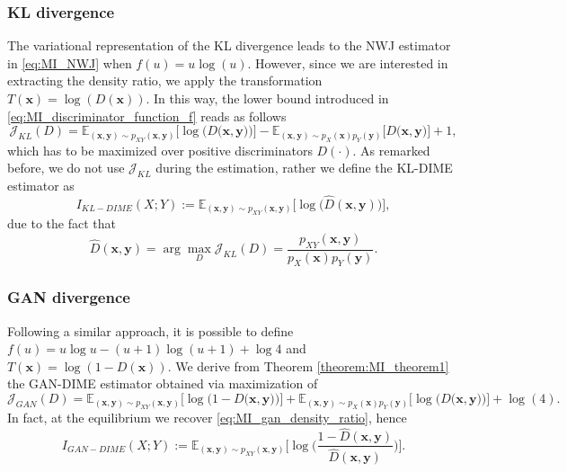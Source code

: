 \subsubsection{KL divergence}
The variational representation of the KL divergence \cite{Nguyen2010} leads to the NWJ estimator in \eqref{eq:MI_NWJ} when $f(u) = u\log(u)$. However, since we are interested in extracting the density ratio, we apply the transformation $T(\mathbf{x})=\log(D(\mathbf{x}))$. In this way, the lower bound introduced in \eqref{eq:MI_discriminator_function_f} reads as follows
\begin{equation}
\mathcal{J}_{KL}(D) = \mathbb{E}_{(\mathbf{x},\mathbf{y}) \sim p_{XY}(\mathbf{x},\mathbf{y})}\biggl[\log\bigl(D\bigl(\mathbf{x},\mathbf{y}\bigr)\bigr)\biggr] -\mathbb{E}_{(\mathbf{x},\mathbf{y}) \sim p_{X}(\mathbf{x})p_{Y}(\mathbf{y})}\biggl[D\bigl(\mathbf{x},\mathbf{y}\bigr)\biggr]+1,
\end{equation}
which has to be maximized over positive discriminators $D(\cdot)$.
As remarked before, we do not use $\mathcal{J}_{KL}$ during the estimation, rather we define the KL-DIME estimator as
\begin{equation}
\label{eq:MI_KL-DIME}
I_{KL-DIME}(X;Y) :=  \mathbb{E}_{(\mathbf{x},\mathbf{y}) \sim p_{XY}(\mathbf{x},\mathbf{y})}\biggl[ \log \biggl(\hat{D}(\mathbf{x},\mathbf{y})\biggr) \biggr],
\end{equation}
due to the fact that
\begin{equation}
\label{eq:MI_optimal_ratio_KL}
\hat{D}(\mathbf{x},\mathbf{y}) =\arg \max_D \mathcal{J}_{KL}(D) = \frac{p_{XY}(\mathbf{x},\mathbf{y})}{p_X(\mathbf{x})p_Y(\mathbf{y})}.
\end{equation}

\subsubsection{GAN divergence}
Following a similar approach, it is possible to define $f(u) = u\log u-(u+1)\log(u+1)+\log4$ and $T(\mathbf{x})=\log(1-D(\mathbf{x}))$. We derive from Theorem \ref{theorem:MI_theorem1} the GAN-DIME estimator obtained via maximization of
\begin{equation}
\mathcal{J}_{GAN}(D) = \mathbb{E}_{(\mathbf{x},\mathbf{y}) \sim p_{XY}(\mathbf{x},\mathbf{y})}\biggl[\log\bigl(1-D\bigl(\mathbf{x},\mathbf{y}\bigr)\bigr)\biggr] +\mathbb{E}_{(\mathbf{x},\mathbf{y}) \sim p_{X}(\mathbf{x})p_{Y}(\mathbf{y})}\biggl[\log\bigl(D\bigl(\mathbf{x},\mathbf{y}\bigr)\bigr)\biggr]+\log(4).
\end{equation}
In fact, at the equilibrium we recover \eqref{eq:MI_gan_density_ratio}, hence
\begin{equation}
\label{eq:MI_GAN-DIME}
I_{GAN-DIME}(X;Y) :=  \mathbb{E}_{(\mathbf{x},\mathbf{y}) \sim p_{XY}(\mathbf{x},\mathbf{y})}\biggl[ \log \biggl(\frac{1-\hat{D}(\mathbf{x},\mathbf{y})}{\hat{D}(\mathbf{x},\mathbf{y})}\biggr) \biggr].
\end{equation}

